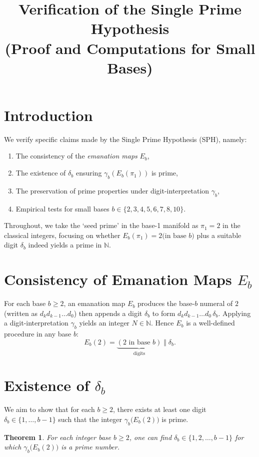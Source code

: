 \documentclass[11pt]{article}
\newtheorem{theorem}{Theorem}
\begin{document}
\title{Verification of the Single Prime Hypothesis \\(Proof and Computations for Small Bases)}
\author{}
\date{}
\maketitle

\section{Introduction}
We verify specific claims made by the Single Prime Hypothesis (SPH), namely:
\begin{enumerate}
\item The consistency of the \emph{emanation maps} $E_b$,
\item The existence of $\delta_b$ ensuring $\gamma_b(E_b(\pi_1))$ is prime,
\item The preservation of prime properties under digit-interpretation $\gamma_b$,
\item Empirical tests for small bases $b \in \{2,3,4,5,6,7,8,10\}$.
\end{enumerate}

Throughout, we take the `seed prime' in the base-1 manifold as $\pi_1 = 2$ in the classical integers, 
focusing on whether $E_b(\pi_1) = 2 \text{(in base } b\text{)}$ plus a suitable digit $\delta_b$ 
indeed yields a prime in $\mathbb{N}$. 

\section{Consistency of Emanation Maps $E_b$}
For each base $b\ge2$, an emanation map $E_b$ produces the base-$b$ numeral of $2$ (written as $d_k d_{k-1}\dots d_0$) 
then appends a digit $\delta_b$ to form $d_k d_{k-1}\dots d_0\,\delta_b$. 
Applying a digit-interpretation $\gamma_b$ yields an integer $N \in \mathbb{N}$. 
Hence $E_b$ is a well-defined procedure in any base $b$:
\[
  E_b(2) = \underbrace{(2\text{ in base }b)}_{\text{digits}} \;\Vert\; \delta_b.
\]

\section{Existence of \texorpdfstring{$\delta_b$}{db}}
We aim to show that for each $b \ge 2$, there exists at least one digit $\delta_b\in \{1,\dots,b-1\}$ 
such that the integer $\gamma_b\bigl(E_b(2)\bigr)$ is prime.

\begin{theorem}
For each integer base $b \ge 2$, one can find $\delta_b \in \{1,2,\ldots,b-1\}$ for which 
$\gamma_b\bigl(E_b(2)\bigr)$ is a prime number.
\end{theorem}
\end{document}
